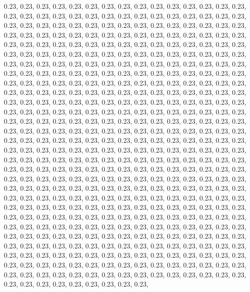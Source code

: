 \documentclass[11pt,]{article}
\begin{document}
0.23, 0.23, 0.23, 0.23, 0.23, 0.23, 0.23, 0.23, 0.23, 0.23, 0.23, 0.23,
0.23, 0.23, 0.23, 0.23, 0.23, 0.23, 0.23, 0.23, 0.23, 0.23, 0.23, 0.23,
0.23, 0.23, 0.23, 0.23, 0.23, 0.23, 0.23, 0.23, 0.23, 0.23, 0.23, 0.23,
0.23, 0.23, 0.23, 0.23, 0.23, 0.23, 0.23, 0.23, 0.23, 0.23, 0.23, 0.23,
0.23, 0.23, 0.23, 0.23, 0.23, 0.23, 0.23, 0.23, 0.23, 0.23, 0.23, 0.23,
0.23, 0.23, 0.23, 0.23, 0.23, 0.23, 0.23, 0.23, 0.23, 0.23, 0.23, 0.23,
0.23, 0.23, 0.23, 0.23, 0.23, 0.23, 0.23, 0.23, 0.23, 0.23, 0.23, 0.23,
0.23, 0.23, 0.23, 0.23, 0.23, 0.23, 0.23, 0.23, 0.23, 0.23, 0.23, 0.23,
0.23, 0.23, 0.23, 0.23, 0.23, 0.23, 0.23, 0.23, 0.23, 0.23, 0.23, 0.23,
0.23, 0.23, 0.23, 0.23, 0.23, 0.23, 0.23, 0.23, 0.23, 0.23, 0.23, 0.23,
0.23, 0.23, 0.23, 0.23, 0.23, 0.23, 0.23, 0.23, 0.23, 0.23, 0.23, 0.23,
0.23, 0.23, 0.23, 0.23, 0.23, 0.23, 0.23, 0.23, 0.23, 0.23, 0.23, 0.23,
0.23, 0.23, 0.23, 0.23, 0.23, 0.23, 0.23, 0.23, 0.23, 0.23, 0.23, 0.23,
0.23, 0.23, 0.23, 0.23, 0.23, 0.23, 0.23, 0.23, 0.23, 0.23, 0.23, 0.23,
0.23, 0.23, 0.23, 0.23, 0.23, 0.23, 0.23, 0.23, 0.23, 0.23, 0.23, 0.23,
0.23, 0.23, 0.23, 0.23, 0.23, 0.23, 0.23, 0.23, 0.23, 0.23, 0.23, 0.23,
0.23, 0.23, 0.23, 0.23, 0.23, 0.23, 0.23, 0.23, 0.23, 0.23, 0.23, 0.23,
0.23, 0.23, 0.23, 0.23, 0.23, 0.23, 0.23, 0.23, 0.23, 0.23, 0.23, 0.23,
0.23, 0.23, 0.23, 0.23, 0.23, 0.23, 0.23, 0.23, 0.23, 0.23, 0.23, 0.23,
0.23, 0.23, 0.23, 0.23, 0.23, 0.23, 0.23, 0.23, 0.23, 0.23, 0.23, 0.23,
0.23, 0.23, 0.23, 0.23, 0.23, 0.23, 0.23, 0.23, 0.23, 0.23, 0.23, 0.23,
0.23, 0.23, 0.23, 0.23, 0.23, 0.23, 0.23, 0.23, 0.23, 0.23, 0.23, 0.23,
0.23, 0.23, 0.23, 0.23, 0.23, 0.23, 0.23, 0.23, 0.23, 0.23, 0.23, 0.23,
0.23, 0.23, 0.23, 0.23, 0.23, 0.23, 0.23, 0.23, 0.23, 0.23, 0.23, 0.23,
0.23, 0.23, 0.23, 0.23, 0.23, 0.23, 0.23, 0.23, 0.23, 0.23, 0.23, 0.23,
0.23, 0.23, 0.23, 0.23, 0.23, 0.23, 0.23, 0.23, 0.23, 0.23, 0.23, 0.23,
0.23, 0.23, 0.23, 0.23, 0.23, 0.23, 0.23, 0.23, 0.23, 0.23, 0.23, 0.23,
0.23, 0.23, 0.23, 0.23, 0.23, 0.23, 0.23, 0.23, 0.23, 0.23, 0.23, 0.23,
0.23, 0.23, 0.23, 0.23, 0.23, 0.23, 0.23, 0.23, 0.23, 0.23, 0.23, 0.23,
0.23, 0.23, 0.23, 0.23, 0.23, 0.23, 0.23, 0.23, 0.23, 0.23, 0.23, 0.23,
0.23, 0.23, 0.23, 0.23, 0.23, 0.23, 0.23, 0.23, 0.23, 0.23, 0.23, 0.23,
0.23, 0.23, 0.23, 0.23, 0.23, 0.23, 0.23, 0.23, 0.23, 0.23, 0.23, 0.23,
0.23, 0.23, 0.23, 0.23, 0.23, 0.23, 0.23, 0.23, 0.23, 0.23, 0.23, 0.23,
0.23, 0.23, 0.23, 0.23, 0.23, 0.23, 0.23, 0.23, 0.23, 0.23, 0.23, 0.23,
0.23, 0.23, 0.23, 0.23, 0.23, 0.23, 0.23, 0.23, 0.23, 0.23, 0.23, 0.23,
0.23, 0.23, 0.23, 0.23, 0.23, 0.23, 0.23, 0.23, 0.23, 0.23, 0.23, 0.23,
0.23, 0.23, 0.23, 0.23, 0.23, 0.23, 0.23, 0.23, 0.23, 0.23, 0.23, 0.23,
\end{document}
